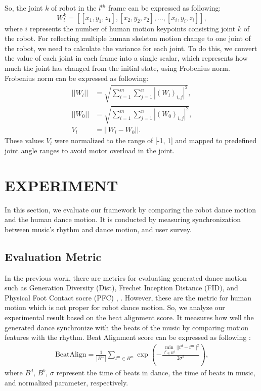 \documentclass[letterpaper, 10 pt, conference]{ieeeconf}  %
\begin{document}
So, the joint $k$ of robot in the $l^{th}$ frame can be expressed as following: $$W^k_l = [[x_1,y_1,z_1],[x_2,y_2,z_2],...,[x_i,y_i,z_i]],$$ where $i$ represents the number of human motion keypoints consisting joint $k$ of the robot. For reflecting multiple human skeleton motion change to one joint of the robot, we need to calculate the variance for each joint. To do this, we convert the value of each joint in each frame into a single scalar, which represents how much the joint has changed from the initial state, using Frobenius norm. Frobenius norm can be expressed as following:
\begin{align*}
    ||W_{l}|| &= \sqrt{\sum^{m}_{i=1}\sum^{n}_{j=1}|(W_{l})_{i,j}|^{2}}, \\
    ||W_{0}|| &= \sqrt{\sum^{m}_{i=1}\sum^{n}_{j=1}|(W_{0})_{i,j}|^{2}}, \\
    V_{l} &= ||W_{l} - W_{0}||.
\end{align*}
These values $V_{l}$ were normalized to the range of [-1, 1] and mapped to predefined joint angle ranges to avoid motor overload in the joint.

\section{EXPERIMENT}
In this section, we evaluate our framework by comparing the robot dance motion and the human dance motion. It is conducted by measuring synchronization between music's rhythm and dance motion, and user survey.

\subsection{Evaluation Metric}
In the previous work, there are metrics for evaluating generated dance motion such as Generation Diversity (Dist), Frechet Inception Distance (FID), and Physical Foot Contact socre (PFC) \cite{tseng2023edge}, \cite{siyao2022bailando}. However, these are the metric for human motion which is not proper for robot dance motion. So, we analyze our experimental result based on the beat alignment score. It measures how well the generated dance synchronize with the beats of the music by comparing motion features with the rhythm. Beat Alignment score can be expressed as following \cite{siyao2022bailando}:
\begin{align*}
    \text{BeatAlign} = \frac{1}{|B^{m}|}\sum_{t^{m} \in B^{m}}\exp\left(-\frac{\min_{ t^{d}\in B^{d}}||t^{d} - t^{m}||^{2}}{2\sigma^{2}}\right),
\end{align*}
where $B^{d}$, $B^{b}$, $\sigma$ represent the time of beats in dance, the time of beats in music, and normalized parameter, respectively.
\end{document}
